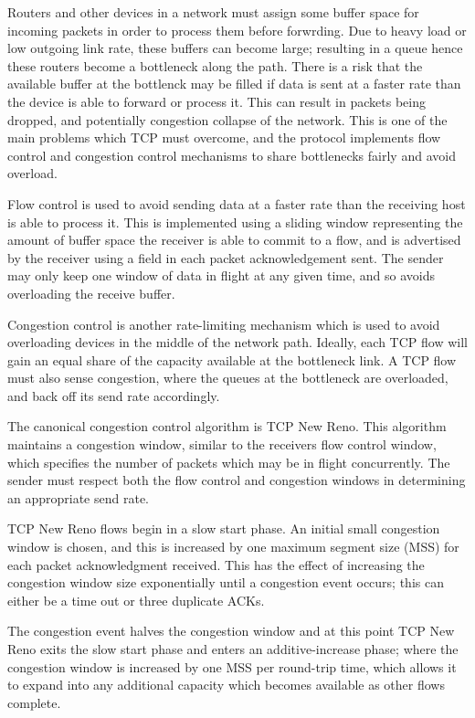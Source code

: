 Routers and other devices in a network must assign some buffer space for
incoming packets in order to process them before forwrding. Due to heavy load or 
low outgoing link rate, these buffers can become large; resulting in a queue 
hence these routers become a bottleneck along the path. There is a risk that the 
available buffer at the bottlenck may be filled if data is sent at a faster rate 
than the device is able to forward or process it. This can result in packets 
being dropped, and potentially congestion collapse of the network. This is one 
of the main problems which TCP must overcome, and the protocol implements flow
control and congestion control mechanisms to share bottlenecks fairly and avoid 
overload.

Flow control is used to avoid sending data at a faster rate than the receiving
host is able to process it. This is implemented using a sliding window
representing the amount of buffer space the receiver is able to commit to a
flow, and is advertised by the receiver using a field in each packet
acknowledgement sent. The sender may only keep one window of data in flight at
any given time, and so avoids overloading the receive buffer.

Congestion control is another rate-limiting mechanism which is used to avoid
overloading devices in the middle of the network path. Ideally, each TCP flow
will gain an equal share of the capacity available at the bottleneck link. A TCP
flow must also sense congestion, where the queues at the bottleneck are
overloaded, and back off its send rate accordingly.

The canonical congestion control algorithm is TCP New Reno. This algorithm
maintains a congestion window, similar to the receivers flow control window,
which specifies the number of packets which may be in flight concurrently. The
sender must respect both the flow control and congestion windows in determining
an appropriate send rate.

TCP New Reno flows begin in a slow start phase. An initial small congestion
window is chosen, and this is increased by one maximum segment size (MSS) for
each packet acknowledgment received. This has the effect of increasing the
congestion window size exponentially until a congestion event occurs; this can 
either be a time out or three duplicate ACKs. 

The congestion event halves the congestion window and at this point TCP New Reno 
exits the slow start phase and enters an additive-increase phase; where the 
congestion window is increased by one MSS per round-trip time, which allows it 
to expand into any additional capacity which becomes available as other flows 
complete.

